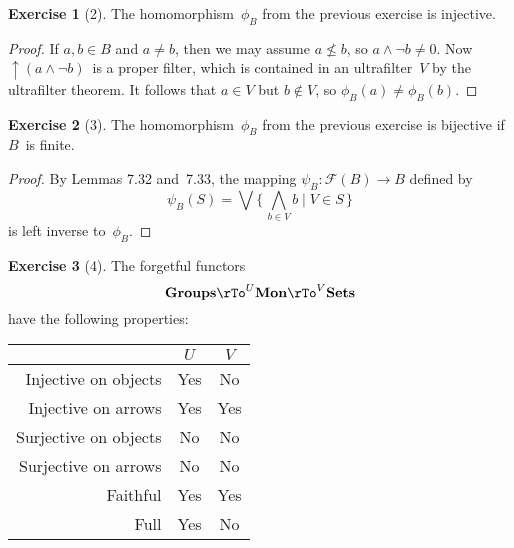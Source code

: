 \documentclass[letterpaper,12pt]{article}
\newcommand{\meet}{\wedge}
\newcommand{\bigmeet}{\bigwedge}
\newcommand{\bigjoin}{\bigvee}
\newcommand{\compl}{\lnot}
\DeclareMathOperator{\up}{\uparrow}
\newcommand{\cat}[1]{\mathbf{#1}}
\newcommand{\Sets}{\cat{Sets}}
\newcommand{\Mon}{\cat{Mon}}
\newcommand{\Grp}{\cat{Groups}}
\theoremstyle{definition}
\newtheorem*{exer}{Exercise}
\theoremstyle{remark}
\theoremstyle{direction}
\begin{document}
\begin{exer}[2]
The homomorphism~\(\phi_B\) from the previous exercise is injective.
\end{exer}
\begin{proof}
If \(a,b\in B\) and \(a\ne b\), then we may assume \(a\not\le b\), so \(a\meet\compl b\ne 0\). Now \(\up(a\meet\compl b)\)~is a proper filter, which is contained in an ultrafilter~\(V\) by the ultrafilter theorem. It follows that \(a\in V\) but \(b\not\in V\), so \(\phi_B(a)\ne\phi_B(b)\).
\end{proof}

\begin{exer}[3]
The homomorphism~\(\phi_B\) from the previous exercise is bijective if \(B\)~is finite.
\end{exer}
\begin{proof}
By Lemmas 7.32 and~7.33, the mapping \(\psi_B:\mathcal{F}(B)\to B\) defined by
\[\psi_B(S)=\bigjoin\{\,\bigmeet_{b\in V}b\mid V\in S\,\}\]
is left inverse to~\(\phi_B\).
\end{proof}

\begin{exer}[4]
The forgetful functors
\[\Grp\rTo^{U}\Mon\rTo^{V}\Sets\]
have the following properties:
\begin{center}
\begin{tabular}{|r|c|c|}
\hline
						&\(U\)	&\(V\)\\
\hline
Injective on objects	&Yes	&No\\
Injective on arrows		&Yes	&Yes\\
Surjective on objects	&No		&No\\
Surjective on arrows	&No		&No\\
Faithful				&Yes	&Yes\\
Full					&Yes	&No\\
\hline
\end{tabular}
\end{center}
\end{exer}
\end{document}
